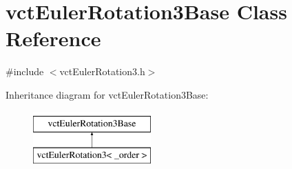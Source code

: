 \hypertarget{classvct_euler_rotation3_base}{}\section{vct\+Euler\+Rotation3\+Base Class Reference}
\label{classvct_euler_rotation3_base}


{\ttfamily \#include $<$vct\+Euler\+Rotation3.\+h$>$}

Inheritance diagram for vct\+Euler\+Rotation3\+Base\+:\begin{figure}[H]
\begin{center}
\leavevmode
\includegraphics[height=2.000000cm]{de/d73/classvct_euler_rotation3_base}
\end{center}
\end{figure}
